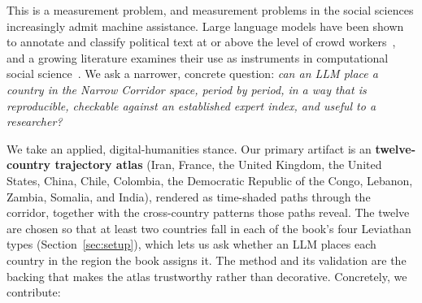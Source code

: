 \documentclass[twocolumn,10pt]{article}
\begin{document}
This is a measurement problem, and measurement problems in the social sciences
increasingly admit machine assistance. Large language models have been shown to
annotate and classify political text at or above the level of crowd
workers~\citep{gilardi2023chatgpt}, and a growing literature examines their use
as instruments in computational social science~\citep{ziems2024can}. We ask a
narrower, concrete question: \emph{can an LLM place a country in the Narrow
Corridor space, period by period, in a way that is reproducible, checkable
against an established expert index, and useful to a researcher?}

We take an applied, digital-humanities stance. Our primary artifact is an
\textbf{twelve-country trajectory atlas} (Iran, France, the United Kingdom, the
United States, China, Chile, Colombia, the Democratic Republic of the Congo,
Lebanon, Zambia, Somalia, and India), rendered as time-shaded paths through the
corridor, together with the cross-country patterns those paths reveal. The twelve
are chosen so that at least two countries fall in each of the book's four
Leviathan types (Section~\ref{sec:setup}), which lets us ask whether an LLM
places each country in the region the book assigns it. The
method and its validation are the backing that makes the atlas trustworthy
rather than decorative. Concretely, we contribute:
\end{document}
